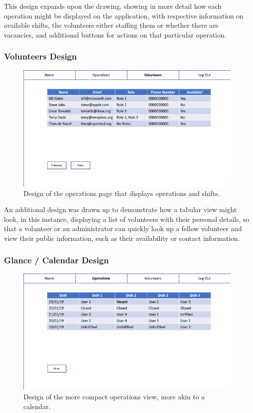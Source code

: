 This design expands upon the drawing, showing in more detail how each operation might be displayed on the application, with respective information on available shifts, the volunteers either staffing them or whether there are vacancies, and additional buttons for actions on that particular operation.

\subsubsection{Volunteers Design}
\begin{figure}[h]
    \includegraphics[width=1.0\textwidth]{Figures/design-volunteers}
    \caption{Design of the operations page that displays operations and shifts.}
    \label{fig:volunteers}
\end{figure}

An additional design was drawn up to demonstrate how a tabular view might look, in this instance, displaying a list of volunteers with their personal details, so that a volunteer or an administrator can quickly look up a fellow volunteer and view their public information, such as their availability or contact information.

\subsubsection{Glance / Calendar Design}
\begin{figure}[h]
    \includegraphics[width=1.0\textwidth]{Figures/design-glance}
    \caption{Design of the more compact operations view, more akin to a calendar.}
    \label{fig:glance}
\end{figure}

